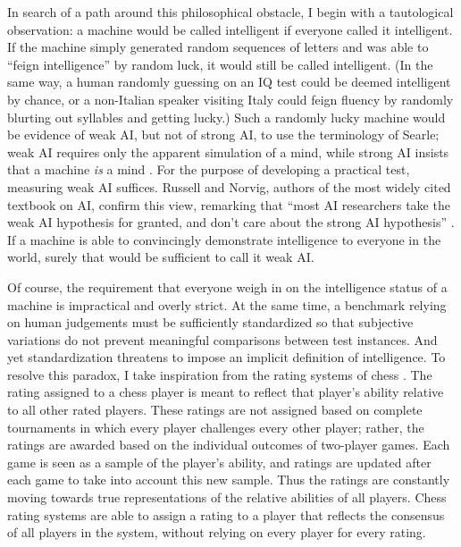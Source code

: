 In search of a path around this philosophical obstacle, I begin with a tautological observation: a machine would be called intelligent if everyone called it intelligent. If the machine simply generated random sequences of letters and was able to ``feign intelligence'' by random luck, it would still be called intelligent. (In the same way, a human randomly guessing on an IQ test could be deemed intelligent by chance, or a non-Italian speaker visiting Italy could feign fluency by randomly blurting out syllables and getting lucky.) Such a randomly lucky machine would be evidence of weak AI, but not of strong AI, to use the terminology of Searle; weak AI requires only the apparent simulation of a mind, while strong AI insists that a machine \textit{is} a mind \cite{searle1980minds}. For the purpose of developing a practical test, measuring weak AI suffices. Russell and Norvig, authors of the most widely cited textbook on AI, confirm this view, remarking that ``most AI researchers take the weak AI hypothesis for granted, and don't care about the strong AI hypothesis'' \cite{russell1995modern}. If a machine is able to convincingly demonstrate intelligence to everyone in the world, surely that would be sufficient to call it weak AI.

Of course, the requirement that everyone weigh in on the intelligence status of a machine is impractical and overly strict. At the same time, a benchmark relying on human judgements must be sufficiently standardized so that subjective variations do not prevent meaningful comparisons between test instances. And yet standardization threatens to impose an implicit definition of intelligence. To resolve this paradox, I take inspiration from the rating systems of chess \cite{glickman1995chess}. The rating assigned to a chess player is meant to reflect that player's ability relative to all other rated players. These ratings are not assigned based on complete tournaments in which every player challenges every other player; rather, the ratings are awarded based on the individual outcomes of two-player games. Each game is seen as a sample of the player's ability, and ratings are updated after each game to take into account this new sample. Thus the ratings are constantly moving towards true representations of the relative abilities of all players. Chess rating systems are able to assign a rating to a player that reflects the consensus of all players in the system, without relying on every player for every rating.

